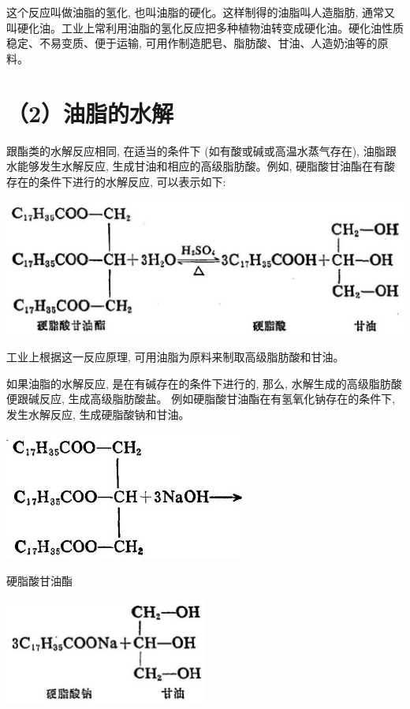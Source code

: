 \documentclass[10pt]{article}
\begin{document}
这个反应叫做油脂的氢化, 也叫油脂的硬化。这样制得的油脂叫人造脂肪, 通常又叫硬化油。工业上常利用油脂的氢化反应把多种植物油转变成硬化油。硬化油性质稳定、不易变质、便于运输, 可用作制造肥皂、脂肪酸、甘油、人造奶油等的原料。

\section*{（2）油脂的水解}

跟酯类的水解反应相同, 在适当的条件下 (如有酸或碱或高温水蒸气存在), 油脂跟水能够发生水解反应, 生成甘油和相应的高级脂肪酸。例如, 硬脂酸甘油酯在有酸存在的条件下进行的水解反应, 可以表示如下:

\begin{center}
\includegraphics[max width=1.0\textwidth]{images/01912d16-be99-77bb-9535-4f3ed8d9946f_145_571746.jpg}
\end{center}

工业上根据这一反应原理, 可用油脂为原料来制取高级脂肪酸和甘油。

如果油脂的水解反应, 是在有碱存在的条件下进行的, 那么, 水解生成的高级脂肪酸便跟碱反应, 生成高级脂肪酸盐。 例如硬脂酸甘油酯在有氢氧化钠存在的条件下, 发生水解反应, 生成硬脂酸钠和甘油。

\begin{center}
\includegraphics[max width=0.6\textwidth]{images/01912d16-be99-77bb-9535-4f3ed8d9946f_145_447332.jpg}
\end{center}

硬脂酸甘油酯

\begin{center}
\includegraphics[max width=0.5\textwidth]{images/01912d16-be99-77bb-9535-4f3ed8d9946f_145_933542.jpg}
\end{center}
\end{document}
